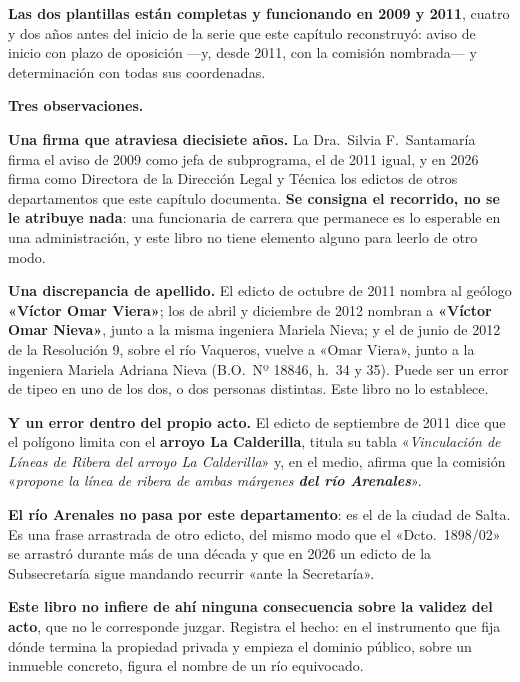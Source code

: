 \textbf{Las dos plantillas están completas y funcionando en 2009 y 2011}, cuatro y dos años
antes del inicio de la serie que este capítulo reconstruyó: aviso de inicio con plazo de
oposición ---y, desde 2011, con la comisión nombrada--- y determinación con todas sus
coordenadas.

\begin{cautela}
\textbf{Tres observaciones.}

\textbf{Una firma que atraviesa diecisiete años.} La Dra.\ Silvia F.\ Santamaría firma el aviso
de 2009 como jefa de subprograma, el de 2011 igual, y en 2026 firma como Directora de la
Dirección Legal y Técnica los edictos de otros departamentos que este capítulo documenta.
\textbf{Se consigna el recorrido, no se le atribuye nada}: una funcionaria de carrera que
permanece es lo esperable en una administración, y este libro no tiene elemento alguno para
leerlo de otro modo.

\textbf{Una discrepancia de apellido.} El edicto de octubre de 2011 nombra al geólogo
\textbf{«Víctor Omar Viera»}; los de abril y diciembre de 2012 nombran a \textbf{«Víctor Omar
Nieva»}, junto a la misma ingeniera Mariela Nieva; y el de junio de 2012 de la Resolución 9, sobre el río Vaqueros, vuelve a «Omar Viera», junto a la ingeniera Mariela Adriana Nieva (B.O.\ Nº 18846, h.\ 34 y 35). Puede ser un error de tipeo en uno de los
dos, o dos personas distintas. Este libro no lo establece.

\textbf{Y un error dentro del propio acto.} El edicto de septiembre de 2011 dice que el polígono
limita con el \textbf{arroyo La Calderilla}, titula su tabla «\textit{Vinculación de Líneas de
Ribera del arroyo La Calderilla}» y, en el medio, afirma que la comisión «\textit{propone la
línea de ribera de ambas márgenes \textbf{del río Arenales}}».

\textbf{El río Arenales no pasa por este departamento}: es el de la ciudad de Salta. Es una
frase arrastrada de otro edicto, del mismo modo que el «Dcto.\ 1898/02» se arrastró durante más de una
década y que en 2026 un edicto de la Subsecretaría sigue mandando recurrir «ante la Secretaría».

\textbf{Este libro no infiere de ahí ninguna consecuencia sobre la validez del acto}, que no le
corresponde juzgar. Registra el hecho: en el instrumento que fija dónde termina la propiedad
privada y empieza el dominio público, sobre un inmueble concreto, figura el nombre de un río
equivocado.
\end{cautela}

